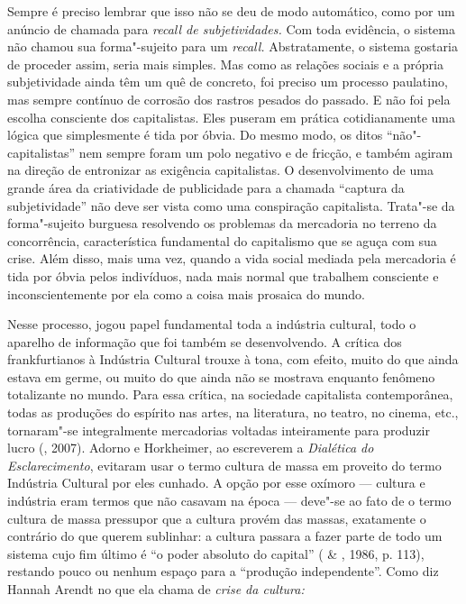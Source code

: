 Sempre é preciso lembrar que isso não se deu de
modo automático, como por um anúncio de chamada para \emph{recall de
subjetividades.} Com toda evidência, o sistema não chamou sua
forma"-sujeito para um \emph{recall.} Abstratamente, o sistema gostaria
de proceder assim, seria mais simples. Mas como as relações sociais e a
própria subjetividade ainda têm um quê de concreto, foi preciso um processo
paulatino, mas sempre contínuo de corrosão dos rastros pesados do
passado. E não foi pela escolha consciente dos capitalistas. Eles
puseram em prática cotidianamente uma lógica que simplesmente é tida por
óbvia. Do mesmo modo, os ditos ``não"-capitalistas'' nem sempre foram um
polo negativo e de fricção, e também agiram na direção de entronizar as
exigência capitalistas. O desenvolvimento de uma grande área da
criatividade de publicidade para a chamada ``captura da subjetividade''
não deve ser vista como uma conspiração capitalista. Trata"-se da
forma"-sujeito burguesa resolvendo os problemas da mercadoria no terreno
da concorrência, característica fundamental do capitalismo que se aguça
com sua crise. Além disso, mais uma vez, quando a vida social mediada
pela mercadoria é tida por óbvia pelos indivíduos, nada mais normal que
trabalhem consciente e inconscientemente por ela como a coisa mais
prosaica do mundo.

Nesse processo, jogou papel fundamental toda a indústria cultural, todo
o aparelho de informação que foi também se desenvolvendo. A crítica dos
frankfurtianos à Indústria Cultural trouxe à tona, com efeito, muito do
que ainda estava em germe, ou muito do que ainda não se mostrava
enquanto fenômeno totalizante no mundo. Para essa crítica, na sociedade
capitalista contemporânea, todas as produções do espírito nas artes, na
literatura, no teatro, no cinema, etc., tornaram"-se integralmente
mercadorias voltadas inteiramente para produzir lucro (, 2007).
Adorno e Horkheimer, ao escreverem a \emph{Dialética do Esclarecimento},
evitaram usar o termo cultura de massa em proveito do termo Indústria
Cultural por eles cunhado. A opção por esse oxímoro --- cultura e
indústria eram termos que não casavam na época --- deve"-se ao fato de o
termo cultura de massa pressupor que a cultura provém das massas,
exatamente o contrário do que querem sublinhar: a cultura passara a
fazer parte de todo um sistema cujo fim último é ``o poder absoluto do
capital'' ( \& , 1986, p. 113), restando pouco ou nenhum
espaço para a ``produção independente''. Como diz Hannah Arendt no que
ela chama de \emph{crise da cultura:}

